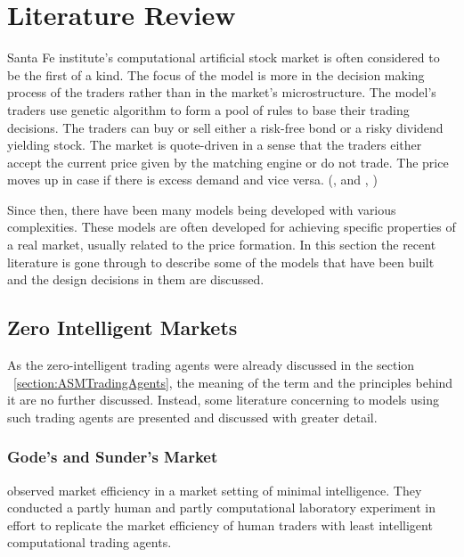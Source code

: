 \section{Literature Review}

Santa Fe institute's computational artificial stock 
market is often considered to be the first of a kind. 
The focus of the model is more in the 
decision making process of the traders rather than in the 
market's microstructure. The model's traders use 
genetic algorithm to form a pool of rules to base
their trading decisions. The traders can buy or
sell either a risk-free bond or a risky dividend yielding stock.
The market is quote-driven in a sense that the traders
either accept the current price given by the matching engine
or do not trade. The price moves up in case if there is excess
demand and vice versa. (\citeauthor{SantaFe94}, \citeyear{SantaFe94} 
and \citeauthor{SantaFe99}, \citeyear{SantaFe99})

Since then, there have been many models being 
developed with various complexities. These models are often developed
for achieving specific properties of a real market, 
usually related to the price formation. In this section
the recent literature is gone through to describe some of the models
that have been built and the design decisions in them are discussed.


\subsection{Zero Intelligent Markets}


As the zero-intelligent trading agents were already discussed in the section 
~\ref{section:ASMTradingAgents}, the meaning of the term and the principles 
behind it are no further discussed. Instead, some literature concerning to 
models using such trading agents are presented and discussed with greater detail.

\subsubsection{Gode's and Sunder's Market}
\citet{God93} observed market efficiency in a market setting
of minimal intelligence. They conducted a partly human and partly
computational laboratory experiment in effort to replicate the market
efficiency of human traders with least intelligent computational
trading agents.


